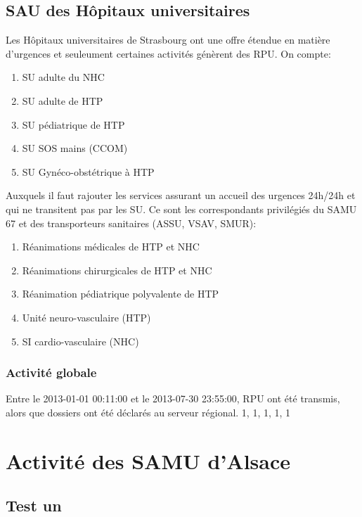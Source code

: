 \documentclass[12pt,english,french,twoside]{report}\usepackage[]{graphicx}\usepackage[]{color}
\begin{document}
\chapter{SAU des Hôpitaux universitaires}

Les Hôpitaux universitaires de Strasbourg ont une offre étendue en matière d'urgences et seuleument certaines activités génèrent des RPU.
On compte:
\begin{enumerate}
  \item SU adulte du NHC
  \item SU adulte de HTP
  \item SU pédiatrique de HTP
  \item SU SOS mains (CCOM)
  \item SU Gynéco-obstétrique à HTP
\end{enumerate}
Auxquels il faut rajouter les services assurant un accueil des urgences 24h/24h et qui ne transitent pas par les SU. Ce sont les correspondants privilégiés du SAMU 67 et des transporteurs sanitaires (ASSU, VSAV, SMUR):
\begin{enumerate}
  \item Réanimations médicales de HTP et NHC
  \item Réanimations chirurgicales de HTP et NHC
  \item Réanimation pédiatrique polyvalente de HTP
  \item Unité neuro-vasculaire (HTP)
  \item SI cardio-vasculaire (NHC)
\end{enumerate}

\section{Activité globale}




Entre le 2013-01-01 00:11:00 et le 2013-07-30 23:55:00,  RPU ont été transmis, alors que  dossiers ont été déclarés au serveur régional. 
1, 1, 1, 1, 1



\part{Activité des SAMU d'Alsace}

\chapter{Test un}
\end{document}
